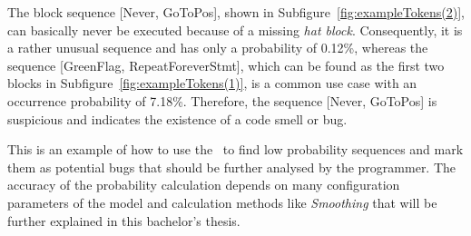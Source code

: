 The block sequence [Never, GoToPos], shown in Subfigure~\ref{fig:exampleTokens(2)}, can basically never be executed because of a missing \textit{hat block}. Consequently, it is a rather unusual sequence and has only a probability of 0.12\%, whereas the sequence [GreenFlag, RepeatForeverStmt], which can be found as the first two blocks in Subfigure~\ref{fig:exampleTokens(1)}, is a common use case with an occurrence probability of 7.18\%. Therefore, the sequence [Never, GoToPos] is suspicious and indicates the existence of a code smell or bug. 

This is an example of how to use the \ngram\ to find low probability sequences and mark them as potential bugs that should be further analysed by the programmer. The accuracy of the probability calculation depends on many configuration parameters of the model and calculation methods like \textit{Smoothing} that will be further explained in this bachelor's thesis. 
